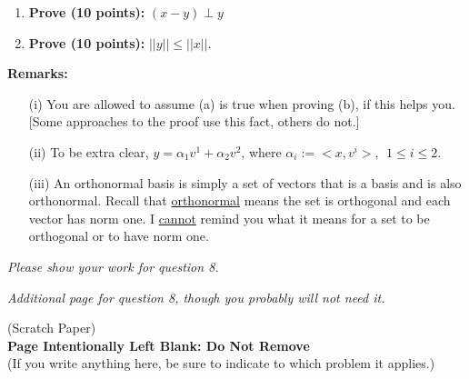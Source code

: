 \documentclass[letterpaper]{article}
\begin{document}
\begin{enumerate}
\setlength{\itemsep}{.15in}
\renewcommand{\labelenumi}{(\alph{enumi})}
\item \textbf{Prove (10 points):} $(x-y) \perp y$
\item \textbf{Prove (10 points):} $||y|| \le ||x||$.\\
\end{enumerate}

\textbf{Remarks:}
\begin{itemize}
    \item[(i)] You are allowed to assume (a) is true when proving (b), if this helps you. [Some approaches to the proof use this fact, others do not.]
\item[(ii)] To be extra clear, $y= \alpha_1 v^1 + \alpha_2 v^2$, where $\alpha_i := <x,v^i>, ~~ 1 \le i \le 2$.
\item[(iii)] An orthonormal basis is simply a set of vectors that is a basis and is also orthonormal. Recall that \underline{orthonormal} means the set is orthogonal and each vector has norm one. I \underline{cannot} remind you what it means for a set to be orthogonal or to have norm one.
\end{itemize}



\newpage
\textit{Please show your work for question 8.}
\newpage

\textit{Additional page for question 8, though you probably will not need it.}
\newpage
\vspace*{2cm}

\begin{center}
(Scratch Paper)\\
{\bf \LARGE Page Intentionally Left Blank: Do Not Remove}\\
(If you write anything here, be sure to indicate to which problem it applies.)

\end{center}


\end{document}
